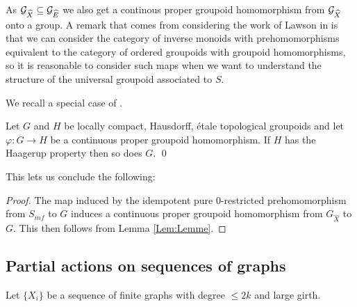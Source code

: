 As $\mathcal{G}_{\widehat{X}} \subseteq \mathcal{G}_{\widehat{E}}$ we also get a continous proper groupoid homomorphism from $\mathcal{G}_{\widehat{X}}$ onto a group.  A remark that comes from considering the work of Lawson in \cite{MR1694900} is that we can consider the category of inverse monoids with prehomomorphisms equivalent to the category of ordered groupoids with groupoid homomorphisms, so it is reasonable to consider such maps when we want to understand the structure of the universal groupoid associated to $S$. 

We recall a special case of \cite[Lemme 3.12]{MR1703305}.

\begin{lemma}\label{Lem:Lemme}
Let $G$ and $H$ be locally compact, Hausdorff, \'etale topological groupoids and let $\varphi: G \rightarrow H$ be a continuous proper groupoid homomorphism. If $H$ has the Haagerup property then so does $G$. \qed
\end{lemma}

This lets us conclude the following:
\begin{proof}
The map induced by the idempotent pure 0-restricted prehomomorphism from $S_{inf}$ to $G$ induces a continuous proper groupoid homomorphism from $G_{\widehat{X}}$ to $G$. This then follows from Lemma \ref{Lem:Lemme}.\end{proof}

\subsection{Partial actions on sequences of graphs}
Let $\lbrace X_{i} \rbrace$ be a sequence of finite graphs with degree $\leq 2k$ and large girth.

